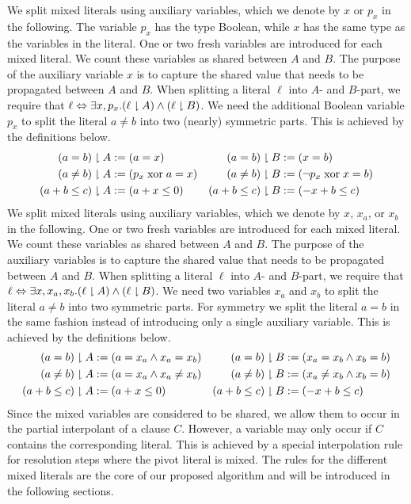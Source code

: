 \ifnewinterpolation
We split mixed literals using auxiliary variables, which we denote by
$x$ or $p_x$ in the following.  The variable $p_x$ has the type Boolean,
while $x$ has the same type as the variables in the literal.  One or
two fresh variables are introduced for each mixed literal.  We count
these variables as shared between $A$ and $B$.  The purpose of the
auxiliary variable $x$ is to capture the shared value that needs to be
propagated between $A$ and $B$.  When splitting a literal $\ell$ into
$A$- and $B$-part, we require that $\ell \Leftrightarrow \exists
x,p_x. (\ell\downharpoonright A) \land (\ell\downharpoonright B)$.  We need the additional
Boolean variable $p_x$ to split the literal $a\neq b$ into two (nearly)
symmetric parts.  This is achieved by the definitions below.
%
\begin{align*}
(a=b)\downharpoonright A & := (a=x) &
(a=b)\downharpoonright B & := (x=b) \\
(a\neq b)\downharpoonright A & := (p_x \mathrel{\mbox{xor}} a=x) &
(a\neq b)\downharpoonright B & := (\lnot p_x \mathrel{\mbox{xor}} x=b) \\
(a + b \leq c)\downharpoonright A & := (a + x\leq 0) &
(a + b \leq c)\downharpoonright B & := (-x + b\leq c)
\end{align*}
\else
We split mixed literals using auxiliary variables, which we denote by
$x$, $x_a$, or $x_b$ in the following.  One or two fresh variables are
introduced for each mixed literal.  We count these variables as shared
between $A$ and $B$.  The purpose of the auxiliary variables is to
capture the shared value that needs to be propagated between $A$ and $B$.
When splitting a literal $\ell$ into $A$- and $B$-part, we require that
$\ell \Leftrightarrow \exists x,x_a,x_b. (\ell\downharpoonright A) \land (\ell\downharpoonright B)$.
We need two variables $x_a$ and $x_b$ to split the literal $a\neq b$ into two
symmetric parts.  For symmetry we split the literal $a=b$ in the same fashion
instead of introducing only a single auxiliary variable.
This is achieved by the definitions below.
%
\begin{align*}
(a=b)\downharpoonright A & := (a=x_a \land x_a = x_b) &
(a=b)\downharpoonright B & := (x_a = x_b  \land x_b=b) \\
(a\neq b)\downharpoonright A & := (a=x_a \land x_a \neq x_b) &
(a\neq b)\downharpoonright B & := (x_a \neq x_b  \land x_b=b) \\
(a + b \leq c)\downharpoonright A & := (a + x\leq 0) &
(a + b \leq c)\downharpoonright B & := (-x + b\leq c)
\end{align*}
\fi
%
%
Since the mixed variables are considered to be shared, we allow them
to occur in the partial interpolant of a clause $C$.  However, a
variable may only occur if $C$ contains the corresponding literal.
This is achieved by a special interpolation rule for resolution steps
where the pivot literal is mixed.
The rules for the different mixed
literals are the core of our proposed algorithm and will be introduced
in the following sections.  

